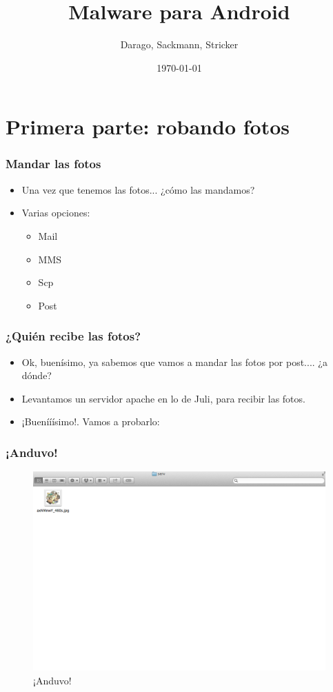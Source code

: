 \documentclass[ignorenonframetext,]{beamer}
\title{Malware para Android}
\author{Darago, Sackmann, Stricker}
\date{\today}
\begin{document}
\frame{\titlepage}


\section{Primera parte: robando fotos}

\begin{frame}\frametitle{Mandar las fotos}
\begin{itemize}[<+->]
\itemsep1pt\parskip0pt
	\item Una vez que tenemos las fotos... ¿cómo las mandamos? \\
	\item Varias opciones:
	\begin{itemize}[<+->]
		\item Mail
		\item MMS
		\item Scp
		\item Post
	\end{itemize}
\end{itemize}

\end{frame}

\begin{frame}\frametitle{¿Quién recibe las fotos?}
	\begin{itemize}[<+->]
		\item Ok, buenísimo, ya sabemos que vamos a mandar las fotos por post.... ¿a dónde?
		\item Levantamos un servidor apache en lo de Juli, para recibir las fotos.
		\item ¡Buenííísimo!. Vamos a probarlo:
	\end{itemize}
\end{frame}

\begin{frame}\frametitle{¡Anduvo!}
	\begin{figure}[htbp]
		\centering
		\includegraphics[scale=0.23]{anduvo.png}
		\caption*{¡Anduvo!}
	\end{figure}		
\end{frame}
\end{document}
